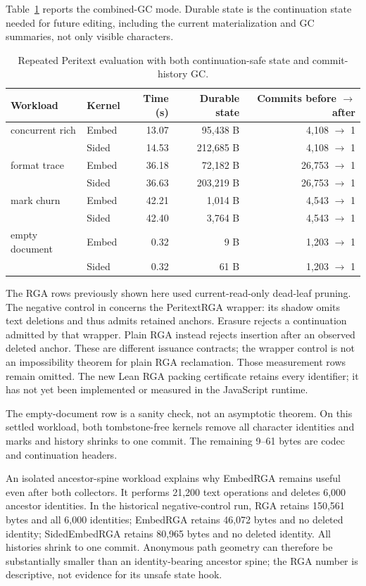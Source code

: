 Table~\ref{tab:peritext-gc} reports the combined-GC mode. Durable state is the
continuation state needed for future editing, including the current
materialization and GC summaries, not only visible characters.

\begin{table}[H]
\centering
\small
\begin{tabular}{@{}llrrr@{}}
\toprule
Workload & Kernel & Time (s) & Durable state & Commits before $\to$ after \\
\midrule
concurrent rich & Embed & 13.07 & 95,438 B & 4,108 $\to$ 1 \\
& Sided & 14.53 & 212,685 B & 4,108 $\to$ 1 \\
format trace & Embed & 36.18 & 72,182 B & 26,753 $\to$ 1 \\
 & Sided & 36.63 & 203,219 B & 26,753 $\to$ 1 \\
mark churn & Embed & 42.21 & 1,014 B & 4,543 $\to$ 1 \\
 & Sided & 42.40 & 3,764 B & 4,543 $\to$ 1 \\
empty document & Embed & 0.32 & 9 B & 1,203 $\to$ 1 \\
 & Sided & 0.32 & 61 B & 1,203 $\to$ 1 \\
\bottomrule
\end{tabular}
\caption{Repeated Peritext evaluation with both continuation-safe state and
commit-history GC.}
\label{tab:peritext-gc}
\end{table}

The RGA rows previously shown here used current-read-only dead-leaf pruning.
The negative control in  concerns the
PeritextRGA wrapper: its shadow omits text deletions and thus admits retained
anchors. Erasure rejects a continuation admitted by that wrapper. Plain RGA
instead rejects insertion after an observed deleted anchor. These are
different issuance contracts; the wrapper control is not an impossibility
theorem for plain RGA reclamation. Those measurement rows remain omitted.
The new Lean RGA packing certificate retains every identifier; it has not yet
been implemented or measured in the JavaScript runtime.

The empty-document row is a sanity check, not an asymptotic theorem. On this
settled workload, both tombstone-free kernels remove all character identities
and marks and history shrinks to one commit. The remaining 9--61 bytes are
codec and continuation headers.

An isolated ancestor-spine workload explains why EmbedRGA remains useful even
after both collectors. It performs 21,200 text operations and deletes 6,000
ancestor identities. In the historical negative-control run, RGA retains
150,561 bytes and all 6,000 identities; EmbedRGA retains 46,072 bytes and no
deleted identity; SidedEmbedRGA retains 80,965 bytes and no deleted identity.
All histories shrink to one commit. Anonymous path geometry can therefore be
substantially smaller than an identity-bearing ancestor spine; the RGA number
is descriptive, not evidence for its unsafe state hook.

